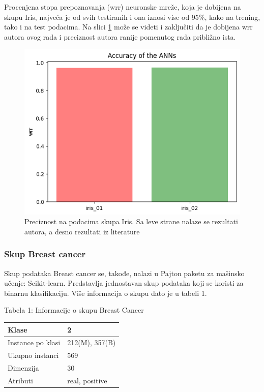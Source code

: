 \documentclass[a4paper]{article}
\begin{document}
{Procenjena stopa prepoznavanja (wrr) neuronske mreže, koja je dobijena na skupu Iris, najveća je od svih testiranih i ona iznosi vise od 95\%, kako na trening, tako i na test podacima. Na slici \ref{fig:irisslika} može se videti i zaključiti da je dobijena wrr autora ovog rada i preciznost autora ranije pomenutog rada \cite{hindawi} približno ista.

\begin{figure}[h!]
\begin{center}
\includegraphics[scale=0.4]{img/iriswrr.png}
\end{center}
\caption{Preciznost na podacima skupa Iris. Sa leve strane nalaze se rezultati autora, a desno rezultati iz literature \cite{hindawi} }
\label{fig:irisslika}
\end{figure}

\subsubsection{Skup Breast cancer}
\label{breast}

Skup podataka Breast cancer se, takođe, nalazi u Pajton paketu za mašinsko učenje: Scikit-learn. Predstavlja jednostavan skup podataka koji se koristi za binarnu klasifikaciju. Više informacija o skupu dato je u tabeli 1.

\begin{center}
Tabela 1: Informacije o skupu Breast Cancer
\begin{tabular}{|p{4cm}|p{2cm}|}
\hline
Klase             & 2              \\ \hline
Instance po klasi & 212(M), 357(B) \\ \hline
Ukupno instanci   & 569            \\ \hline
Dimenzija         & 30             \\ \hline
Atributi          & real, positive \\ \hline
\end{tabular}\par
\bigskip
\end{center} 

}
\end{document}
